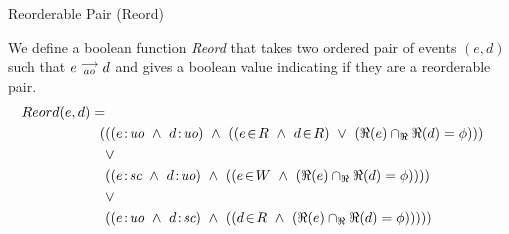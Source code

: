 \begin{definition}{Reorderable Pair (Reord)}
    \label{Reord}
    
    We define a boolean function \emph{Reord} that takes two ordered pair of events $(e,d)$ such that $e\stackrel{\longrightarrow}{_{ao}}d$ and gives a boolean value indicating if they are a reorderable pair.   
    \begin{align*}
        Reord(e,d) = \\
        (
        &((\et{e}{uo} \ \wedge \ \et{d}{uo}) \ \wedge \ 
                (   
                    (\event{e}{R} \ \wedge \ \event{d}{R}) \ \vee \ 
                    (\Re(e) \cap_\Re \Re(d) = \phi) 
                )
        ) \\ &\vee \\
        &((\et{e}{sc} \ \wedge \ \et{d}{uo}) \ \wedge \ 
                (
                    (\event{e}{W} \ \wedge \ (\Re(e) \cap_\Re \Re(d) = \phi)) 
                )
        ) \\ &\vee \\
        &((\et{e}{uo} \ \wedge \ \et{d}{sc}) \ \wedge \ 
                (
                    (\event{d}{R} \ \wedge \ (\Re(e) \cap_\Re \Re(d) = \phi)) 
                )
        )
        )
    \end{align*}

\end{definition}

